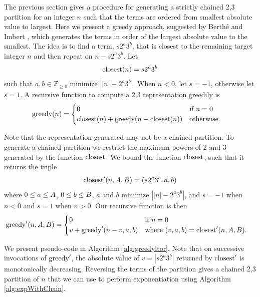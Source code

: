 \documentclass{ucalgthes1}
\theoremstyle{definition}
\newcommand{\ZZgez}{\mathbb{Z}_{\ge 0}}
\begin{document}
The previous section gives a procedure for generating a strictly chained 2,3 partition for an integer $n$ such that the terms are ordered from smallest absolute value to largest.  Here we present a greedy approach, suggested by Berth{\'e} and Imbert \cite{Berthe2009}, which generates the terms in order of the largest absolute value to the smallest. The idea is to find a term, $s2^a3^b$, that is closest to the remaining target integer $n$ and then repeat on $n - s2^a3^b$. Let
\[
\textrm{closest}(n) = s2^a3^b
\]
such that $a,b \in \ZZgez$ minimize $\left| |n| - 2^a3^b \right|$.  When $n < 0$, let $s = -1$, otherwise let $s = 1$.  A recursive function to compute a 2,3 representation greedily is
\begin{align*}
\textrm{greedy}(n) &= \begin{cases}
              0 & \textrm{if $n = 0$} \\
              \textrm{closest}(n) + \textrm{greedy}(n - \textrm{closest}(n)) & \textrm{otherwise}.
          \end{cases}
\end{align*}

\noindent
Note that the representation generated may not be a chained partition. To generate a chained partition we restrict the maximum powers of 2 and 3 generated by the function $\textrm{closest}$.  We bound the function $\textrm{closest}$, such that it returns the triple
\[
\textrm{closest}'(n, A, B) = (s2^a3^b, a, b)
\]
where $0 \le a \le A$, $0 \le b \le B$, $a$ and $b$ minimize $\left| |n| - 2^a3^b \right|$, and $s=-1$ when $n < 0$ and $s=1$ when $n > 0$. Our recursive function is then
\begin{align*}
\textrm{greedy}'(n, A, B) &= \begin{cases}
        0 & \textrm{if $n = 0$} \\
        v + \textrm{greedy}'(n - v, a, b) & \textrm{where $(v, a, b) = \textrm{closest}'(n, A, B)$}.
    \end{cases}
\end{align*}

\noindent
We present pseudo-code in Algorithm \ref{alg:greedyltor}. Note that on successive invocations of $\textrm{greedy}'$, the absolute value of $v=|s2^a3^b|$ returned by $\textrm{closest}'$ is monotonically decreasing.  Reversing the terms of the partition gives a chained 2,3 partition of $n$ that we can use to perform exponentiation using Algorithm \ref{alg:expWithChain}.
\end{document}
